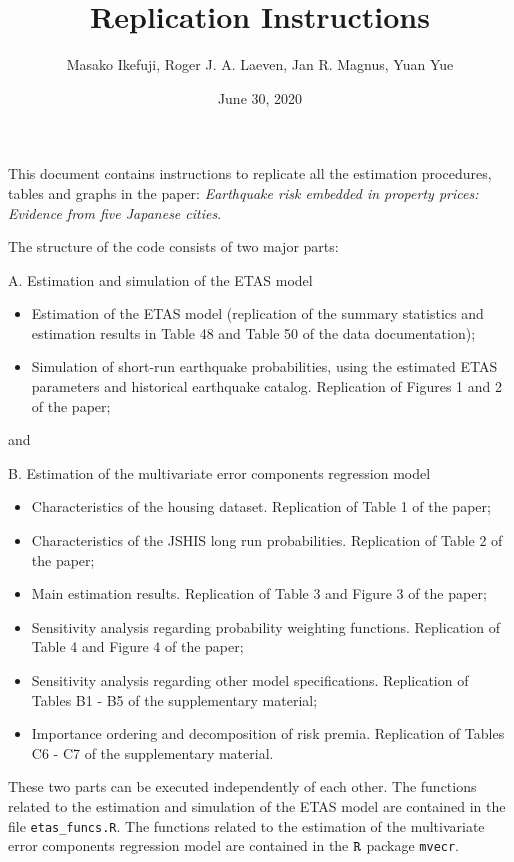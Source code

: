 \documentclass[
]{article}
\title{Replication Instructions}
\author{Masako Ikefuji, Roger J. A. Laeven, Jan R. Magnus, Yuan Yue}
\date{June 30, 2020}
\providecommand{\tightlist}{%
  \setlength{\itemsep}{0pt}\setlength{\parskip}{0pt}}
\begin{document}
\maketitle

This document contains instructions to replicate all the estimation
procedures, tables and graphs in the paper: \emph{Earthquake risk
embedded in property prices: Evidence from five Japanese cities}.

The structure of the code consists of two major parts:

A. Estimation and simulation of the ETAS model

\begin{itemize}
\tightlist
\item
  Estimation of the ETAS model (replication of the summary statistics
  and estimation results in Table 48 and Table 50 of the data
  documentation);
\item
  Simulation of short-run earthquake probabilities, using the estimated
  ETAS parameters and historical earthquake catalog. Replication of
  Figures 1 and 2 of the paper;
\end{itemize}

and

B. Estimation of the multivariate error components regression model

\begin{itemize}
\tightlist
\item
  Characteristics of the housing dataset. Replication of Table 1 of the
  paper;
\item
  Characteristics of the JSHIS long run probabilities. Replication of
  Table 2 of the paper;
\item
  Main estimation results. Replication of Table 3 and Figure 3 of the
  paper;
\item
  Sensitivity analysis regarding probability weighting functions.
  Replication of Table 4 and Figure 4 of the paper;
\item
  Sensitivity analysis regarding other model specifications. Replication
  of Tables B1 - B5 of the supplementary material;
\item
  Importance ordering and decomposition of risk premia. Replication of
  Tables C6 - C7 of the supplementary material.
\end{itemize}

These two parts can be executed independently of each other. The
functions related to the estimation and simulation of the ETAS model are
contained in the file \texttt{etas\_funcs.R}. The functions related to
the estimation of the multivariate error components regression model are
contained in the \(\tt{R}\) package \texttt{mvecr}.
\end{document}
